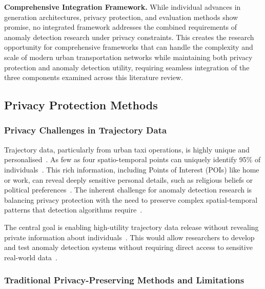 \documentclass[runningheads]{llncs}
\begin{document}
\textbf{Comprehensive Integration Framework.} While individual advances in generation architectures, privacy protection, and evaluation methods show promise, no integrated framework addresses the combined requirements of anomaly detection research under privacy constraints. This creates the research opportunity for comprehensive frameworks that can handle the complexity and scale of modern urban transportation networks while maintaining both privacy protection and anomaly detection utility, requiring seamless integration of the three components examined across this literature review.

\subsection{Privacy Protection Methods}
\label{sec:privacy-review}

\subsubsection{Privacy Challenges in Trajectory Data}

Trajectory data, particularly from urban taxi operations, is highly unique and personalised~\cite{Primault2019LongRoad,Buchholz2022RAoPT,Ma2021TrajectoryPrivacy}. As few as four spatio-temporal points can uniquely identify 95\% of individuals~\cite{Primault2019LongRoad,Buchholz2022RAoPT,Ma2021TrajectoryPrivacy}. This rich information, including Points of Interest (POIs) like home or work, can reveal deeply sensitive personal details, such as religious beliefs or political preferences~\cite{Primault2019LongRoad,Buchholz2022RAoPT}. The inherent challenge for anomaly detection research is balancing privacy protection with the need to preserve complex spatial-temporal patterns that detection algorithms require~\cite{Buchholz2024SoK,Buchholz2022RAoPT,Primault2019LongRoad,Naghizade2020PrivacyContextAware}.

The central goal is enabling high-utility trajectory data release without revealing private information about individuals~\cite{Buchholz2024SoK,Rao2021LSTMTrajGAN,Liu2018TrajGANs,Jin2023SurveyExpStudy,Ma2021TrajectoryPrivacy,Naghizade2020PrivacyContextAware}. This would allow researchers to develop and test anomaly detection systems without requiring direct access to sensitive real-world data~\cite{Buchholz2024SoK,Rao2021LSTMTrajGAN,Liu2018TrajGANs}.

\subsubsection{Traditional Privacy-Preserving Methods and Limitations}
\end{document}

